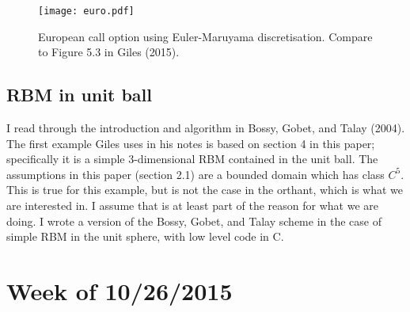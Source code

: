 \documentclass[]{article}
\theoremstyle{definition}
\theoremstyle{remark}
\begin{document}
\begin{figure}[ht!]
\centering
\texttt{[image: euro.pdf]}
\caption{European call option using Euler-Maruyama discretisation. Compare to Figure 5.3 in Giles (2015).}
\end{figure}

\subsection{RBM in unit ball}
I read through the introduction and algorithm in Bossy, Gobet, and Talay (2004). The first example Giles uses in his notes is based on section 4 in this paper; specifically it is a simple 3-dimensional RBM contained in the unit ball. The assumptions in this paper (section 2.1) are a bounded domain which has class $C^5$. This is true for this example, but is not the case in the orthant, which is what we are interested in. I assume that is at least part of the reason for what we are doing. I wrote a version of the Bossy, Gobet, and Talay scheme in the case of simple RBM in the unit sphere, with low level code in C.

\section{Week of 10/26/2015}
\end{document}
